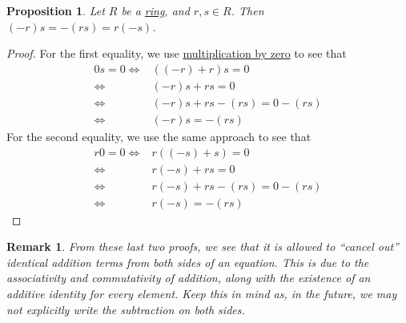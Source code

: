 \documentclass{scrartcl}
\theoremstyle{definition}
\theoremstyle{plain}
\newtheorem{proposition}{Proposition}[section]
\newtheorem{remark}{Remark}[section]
\begin{document}
\begin{proposition}
    Let $R$ be a \hyperref[def:ring]{ring}, and $r,s\in R$.
    Then $(-r)s=-(rs)=r(-s)$.
\end{proposition}

\begin{proof}
    For the first equality, we use \hyperref[prop:multiply by zero]{multiplication by zero} to see that
    \begin{align}
        0s=0
        \iff& ((-r)+r)s=0 \\
        \iff& (-r)s+rs=0 \\
        \iff& (-r)s+rs-(rs)=0-(rs) \\
        \iff& (-r)s=-(rs)
    \end{align}
    For the second equality, we use the same approach to see that
    \begin{align}
        r0=0
        \iff& r((-s)+s)=0 \\
        \iff& r(-s)+rs=0 \\
        \iff& r(-s)+rs-(rs)=0-(rs) \\
        \iff& r(-s)=-(rs)
    \end{align}
\end{proof}

\begin{remark}
    From these last two proofs, we see that it is allowed to ``cancel out'' identical addition terms from both sides of
    an equation.
    This is due to the associativity and commutativity of addition, along with the existence of an additive identity
    for every element.
    Keep this in mind as, in the future, we may not explicitly write the subtraction on both sides.
\end{remark}
\end{document}
